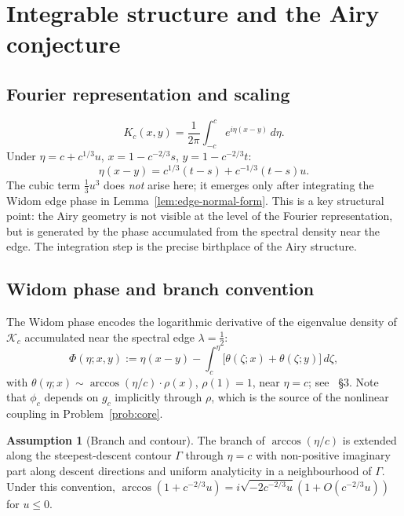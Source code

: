 \documentclass[12pt,a4paper]{amsart}
\theoremstyle{definition}
\newtheorem{assumption}[theorem]{Assumption}
\theoremstyle{remark}
\newcommand{\Kc}{\mathcal{K}_c}
\begin{document}
\section{Integrable structure and the Airy conjecture}
\label{sec:kernel-programme}

\subsection{Fourier representation and scaling}

\begin{equation}\label{eq:sinc-fourier}
  K_c(x,y)=\frac{1}{2\pi}\int_{-c}^{c}e^{i\eta(x-y)}\,d\eta.
\end{equation}
Under $\eta=c+c^{1/3}u$, $x=1-c^{-2/3}s$, $y=1-c^{-2/3}t$:
\begin{equation}\label{eq:linear-phase}
  \eta(x-y)=c^{1/3}(t-s)+c^{-1/3}(t-s)u.
\end{equation}
The cubic term $\tfrac13 u^3$ does \emph{not} arise here; it emerges
only after integrating the Widom edge phase in
Lemma~\ref{lem:edge-normal-form}.
This is a key structural point: the Airy geometry is not visible at the
level of the Fourier representation, but is generated by the phase
accumulated from the spectral density near the edge.
The integration step is the precise birthplace of the Airy structure.

\subsection{Widom phase and branch convention}

The Widom phase encodes the logarithmic derivative of the eigenvalue
density of $\Kc$ accumulated near the spectral edge $\lambda=\tfrac{1}{2}$:
\begin{equation}\label{eq:effective-phase-def}
  \Phi(\eta;x,y):=\eta(x-y)
  -\int_c^\eta\bigl[\theta(\zeta;x)+\theta(\zeta;y)\bigr]\,d\zeta,
\end{equation}
with $\theta(\eta;x)\sim\arccos(\eta/c)\cdot\rho(x)$, $\rho(1)=1$,
near $\eta=c$; see~\cite{Widom1964} \S3.
Note that $\phi_c$ depends on $g_c$ implicitly through $\rho$,
which is the source of the nonlinear coupling in
Problem~\ref{prob:core}.

\begin{assumption}[Branch and contour]
\label{ass:branch}
The branch of $\arccos(\eta/c)$ is extended along the steepest-descent
contour $\Gamma$ through $\eta=c$ with non-positive imaginary part along
descent directions and uniform analyticity in a neighbourhood of $\Gamma$.
Under this convention,
$\arccos(1+c^{-2/3}u)=i\sqrt{-2c^{-2/3}u}(1+O(c^{-2/3}u))$ for $u\le 0$.
\end{assumption}
\end{document}
